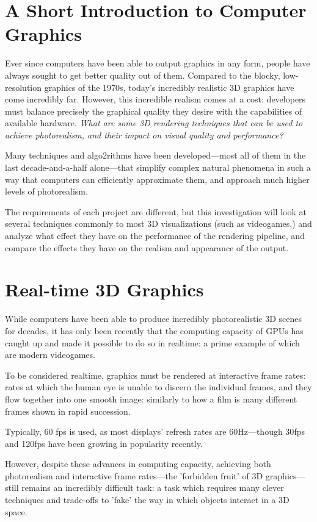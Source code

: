 \documentclass[11pt, oneside]{report}
\begin{document}
\section{A Short Introduction to Computer Graphics}
Ever since computers have been able to output graphics in any form, people have always sought to get better quality out of them. Compared to the blocky, low-resolution graphics of the 1970s, today’s incredibly realistic 3D graphics have come incredibly far. However, this incredible realism comes at a cost: developers must balance precisely the graphical quality they desire with the capabilities of available hardware. \textit{What are some 3D rendering techniques that can be used to achieve photorealism, and their impact on visual quality and performance?}

Many techniques and algo2rithms have been developed—most all of them in the last decade-and-a-half alone—that simplify complex natural phenomena in such a way that computers can efficiently approximate them, and approach much higher levels of photorealism.

The requirements of each project are different, but this investigation will look at several techniques commonly to most 3D visualizations (such as videogames,) and analyze what effect they have on the performance of the rendering pipeline, and compare the effects they have on the realism and appearance of the output.

\section{Real-time 3D Graphics}
While computers have been able to produce incredibly photorealistic 3D scenes for decades, it has only been recently that the computing capacity of \glspl{GPU} has caught up and made it possible to do so in realtime: a prime example of which are modern videogames.

To be considered realtime, graphics must be rendered at interactive \glspl{frame rate}: rates at which the human eye is unable to discern the individual frames, and they flow together into one smooth image: similarly to how a film is many different frames shown in rapid succession.

Typically, 60 \gls{fps} is used, as most displays' \glspl{refresh rate} are 60Hz---though 30\gls{fps} and 120\gls{fps} have been growing in popularity recently.

However, despite these advances in computing capacity, achieving both photorealism and interactive \glspl{frame rate}---the 'forbidden fruit' of 3D graphics---still remains an incredibly difficult task: a task which requires many clever techniques and trade-offs to 'fake' the way in which objects interact in a 3D space.
\end{document}
